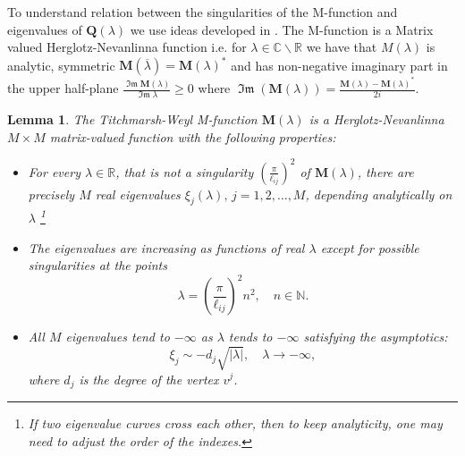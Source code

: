 \documentclass{amsart}
\newtheorem{lemma}[theorem]{Lemma}
\theoremstyle{definition}
\theoremstyle{remark}
\numberwithin{equation}{section}
\DeclareMathOperator{\im}{\mathfrak{Im}}
\begin{document}
To understand relation between the singularities of the M-function and eigenvalues of $ \mathbf Q (\lambda) $ we use ideas developed in \cite{KuNa}. 
The M-function is a Matrix valued Herglotz-Nevanlinna function i.e. for $\lambda\in \mathbb{C}\backslash\mathbb{R}$ we have that $M(\lambda)$ is analytic, 
symmetric $\mathbf M(\overline{\lambda})=\mathbf M(\lambda)^*$ and 
has non-negative imaginary part in the upper half-plane  $\frac{\im{\mathbf M(\lambda)}}{\im{\lambda}}\geq 0$ where $\im(\mathbf M(\lambda))=\frac{\mathbf M(\lambda)-\mathbf M(\lambda)^*}{2i}$.



\begin{lemma} \label{lem2}
The Titchmarsh-Weyl M-function $ \mathbf M(\lambda) $ is a Herglotz-Nevanlinna $ M \times M $ matrix-valued function with the following properties:
\begin{itemize}
\item For every $ \lambda \in \mathbb R $, that is not a singularity $(\frac{\pi}{\ell_{ij}})^2$ of $\mathbf M(\lambda) $, there are precisely $ M $ real eigenvalues  $ \xi_j (\lambda), \, j =1,2, \dots, M $, depending analytically on $ \lambda $
\footnote{If two eigenvalue curves cross each other, then to keep analyticity, one may need to adjust the order of the indexes.}
\item The eigenvalues are increasing as functions of real $\lambda$ except for possible singularities at the points 
\begin{equation} \label{sing}
\lambda=\left(\frac{\pi}{\ell_{ij}}\right)^2 n^2,  \quad n \in \mathbb N.
\end{equation}
\item All $M$ eigenvalues tend to $-\infty$ as $\lambda$ tends to $-\infty$
satisfying the asymptotics:
\begin{equation} \label{asev}
\xi_j \sim - d_j \sqrt{|\lambda|}, \quad \lambda \rightarrow - \infty,
\end{equation}
where $ d_j $ is the degree of the vertex $ v^j$.
\end{itemize}
\end{lemma}
\end{document}

